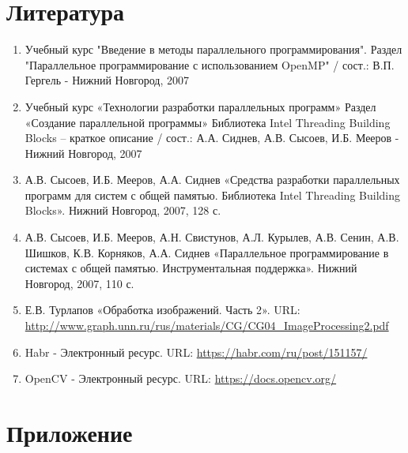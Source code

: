 \documentclass{report}
\begin{document}
\section*{Литература}
\begin{enumerate}
\item Учебный курс "Введение в методы параллельного
программирования". Раздел "Параллельное программирование с использованием
OpenMP"  / сост.: В.П. Гергель - Нижний Новгород, 2007 
\item Учебный курс «Технологии разработки параллельных программ» Раздел «Создание параллельной программы» Библиотека Intel Threading Building Blocks – краткое описание / сост.: А.А. Сиднев, А.В. Сысоев, И.Б. Мееров - Нижний Новгород, 2007
\item А.В. Сысоев, И.Б. Мееров, А.А. Сиднев «Средства разработки параллельных программ для систем с общей памятью. Библиотека Intel Threading Building Blocks». Нижний Новгород, 2007, 128 с. 
\item А.В. Сысоев, И.Б. Мееров, А.Н. Свистунов, А.Л. Курылев, А.В. Сенин, А.В. Шишков, К.В. Корняков, А.А. Сиднев «Параллельное программирование в системах с общей
памятью. Инструментальная поддержка». Нижний Новгород, 2007, 110 с. 
\item Е.В. Турлапов «Обработка изображений. Часть 2». URL: \newline \url{http://www.graph.unn.ru/rus/materials/CG/CG04_ImageProcessing2.pdf}
\item Habr - Электронный ресурс. URL: \newline \url{https://habr.com/ru/post/151157/}
\item OpenCV - Электронный ресурс. URL: \newline \url{https://docs.opencv.org/}

\end{enumerate} 
\newpage

\section*{Приложение}
\end{document}
